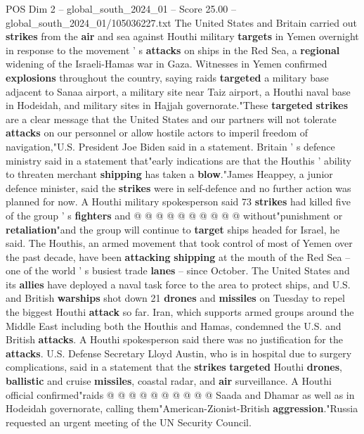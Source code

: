\begin{textsample}{POS Dim 2 – global\_south\_2024\_01 – Score 25.00 – global\_south\_2024\_01/105036227.txt}  \label{ex:f2_pos_093}
The United States and Britain carried out \textbf{strikes} from the \textbf{air} and sea against Houthi military \textbf{targets} in Yemen overnight in response to the movement ' s \textbf{attacks} on ships in the Red Sea, a \textbf{regional} widening of the Israeli-Hamas war in Gaza.
Witnesses in Yemen confirmed \textbf{explosions} throughout the country, saying raids \textbf{targeted} a military base adjacent to Sanaa airport, a military site near Taiz airport, a Houthi naval base in Hodeidah, and military sites in Hajjah governorate."These \textbf{targeted} \textbf{strikes} are a clear message that the United States and our partners will not tolerate \textbf{attacks} on our personnel or allow hostile actors to imperil freedom of navigation,"U.S.
President Joe Biden said in a statement.
Britain ' s defence ministry said in a statement that"early indications are that the Houthis ' ability to threaten merchant \textbf{shipping} has taken a \textbf{blow}."James Heappey, a junior defence minister, said the \textbf{strikes} were in self-defence and no further action was planned for now.
A Houthi military spokesperson said 73 \textbf{strikes} had killed five of the group ' s \textbf{fighters} and @ @ @ @ @ @ @ @ @ @ without"punishment or \textbf{retaliation}"and the group will continue to \textbf{target} ships headed for Israel, he said.
The Houthis, an armed movement that took control of most of Yemen over the past decade, have been \textbf{attacking} \textbf{shipping} at the mouth of the Red Sea -- one of the world ' s busiest trade \textbf{lanes} -- since October.
The United States and its \textbf{allies} have deployed a naval task force to the area to protect ships, and U.S. and British \textbf{warships} shot down 21 \textbf{drones} and \textbf{missiles} on Tuesday to repel the biggest Houthi \textbf{attack} so far.
Iran, which supports armed groups around the Middle East including both the Houthis and Hamas, condemned the U.S. and British \textbf{attacks}.
A Houthi spokesperson said there was no justification for the \textbf{attacks}.
U.S.
Defense Secretary Lloyd Austin, who is in hospital due to surgery complications, said in a statement that the \textbf{strikes} \textbf{targeted} Houthi \textbf{drones}, \textbf{ballistic} and cruise \textbf{missiles}, coastal radar, and \textbf{air} surveillance.
A Houthi official confirmed"raids @ @ @ @ @ @ @ @ @ @ Saada and Dhamar as well as in Hodeidah governorate, calling them"American-Zionist-British \textbf{aggression}."Russia requested an urgent meeting of the UN Security Council.

\end{textsample}
